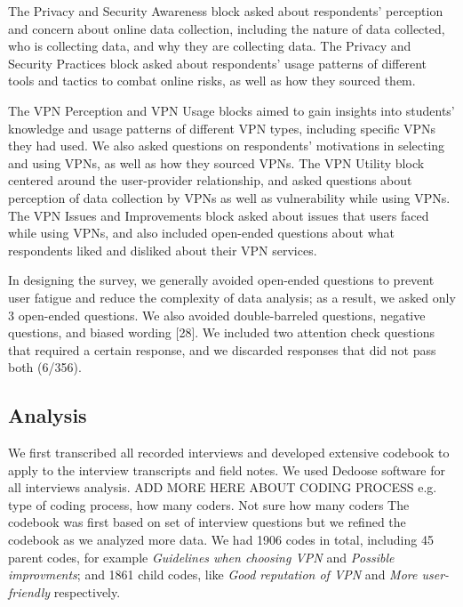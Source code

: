 The Privacy and Security Awareness block asked about respondents' perception
and concern about online data collection, including the nature of data
collected, who is collecting data, and why they are collecting data. The
Privacy and Security Practices block asked about respondents' usage patterns
of different tools and tactics to combat online risks, as well as how they
sourced them.

The VPN Perception and VPN Usage blocks aimed to gain insights into students’
knowledge and usage patterns of different VPN types, including specific VPNs
they had used. We also asked questions on respondents’ motivations in
selecting and using VPNs, as well as how they sourced VPNs. The VPN Utility
block centered around the user-provider relationship, and asked questions
about perception of data collection by VPNs as well as vulnerability while
using VPNs. The VPN Issues and Improvements block asked about issues that
users faced while using VPNs, and also included open-ended questions about
what respondents liked and disliked about their VPN services.

In designing the survey, we generally avoided open-ended questions to prevent
user fatigue and reduce the complexity of data analysis; as a result, we asked
only 3 open-ended questions. We also avoided double-barreled questions,
negative questions, and biased wording [28]. We included two attention check
questions that required a certain response, and we discarded responses that
did not pass both (6/356).


\subsection{Analysis} We first transcribed all recorded interviews and
developed extensive codebook to apply to the interview transcripts and field notes. We used Dedoose software for all interviews analysis.  ADD MORE HERE ABOUT CODING PROCESS e.g. type of coding process, how many coders. Not sure how many coders
The codebook was first based on set of interview questions but we refined the codebook as we analyzed more data. We had 1906 codes in total, including 45 parent codes,
for example \textit{Guidelines when choosing VPN} and \textit{Possible improvments}; and 1861 child codes, like \textit{Good reputation of VPN} and \textit{More user-friendly} respectively.

